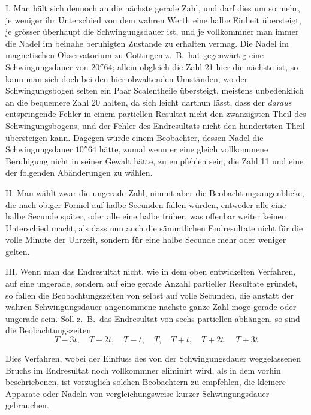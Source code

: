 I. Man hält sich dennoch an die nächste gerade Zahl, und darf dies um so mehr, je weniger ihr Unterschied von dem wahren Werth eine halbe Einheit übersteigt, je grösser überhaupt die Schwingungsdauer ist, und je vollkommner man immer die Nadel im beinahe beruhigten Zustande zu erhalten vermag. Die Nadel im magnetischen Observatorium zu Göttingen z.\ B.\ hat gegenwärtig eine Schwingungsdauer von $20''64$; allein obgleich die Zahl 21 hier die nächste ist, so kann man sich doch bei den hier obwaltenden Umständen, wo der Schwingungsbogen selten ein Paar Scalentheile übersteigt, meistens unbedenklich an die bequemere Zahl 20 halten, da sich leicht darthun lässt, dass der \textit{daraus} entspringende Fehler in einem partiellen Resultat nicht den zwanzigsten Theil des Schwingungsbogens, und der Fehler des Endresultats nicht den hundertsten Theil übersteigen kann. Dagegen würde einem Beobachter, dessen Nadel die Schwingungsdauer $10''64$ hätte, zumal wenn er eine gleich vollkommene Beruhigung nicht in seiner Gewalt hätte, zu empfehlen sein, die Zahl 11 und eine der folgenden Abänderungen zu wählen.

II. Man wählt zwar die ungerade Zahl, nimmt aber die Beobachtungsaugenblicke, die nach obiger Formel auf halbe Secunden fallen würden, entweder alle eine halbe Secunde später, oder alle eine halbe früher, was offenbar weiter keinen Unterschied macht, als dass nun auch die sämmtlichen Endresultate nicht für die volle Minute der Uhrzeit, sondern für eine halbe Secunde mehr oder weniger gelten.

\par\clearpage
{}
III. Wenn man das Endresultat nicht, wie in dem oben entwickelten Verfahren, auf eine ungerade, sondern auf eine gerade Anzahl partieller Resultate gründet, so fallen die Beobachtungszeiten von selbst auf volle Secunden, die anstatt der wahren Schwingungsdauer angenommene nächste ganze Zahl möge gerade oder ungerade sein. Soll z.\ B.\ das Endresultat von sechs partiellen abhängen, so sind die Beobachtungszeiten
\[
T-3t,\quad T-2t,\quad T-t,\quad T,\quad T+t,\quad T+2t,\quad T+3t
\]

Dies Verfahren, wobei der Einfluss des von der Schwingungsdauer weggelassenen Bruchs im Endresultat noch vollkommner eliminirt wird, als in dem vorhin beschriebenen, ist vorzüglich solchen Beobachtern zu empfehlen, die kleinere Apparate oder Nadeln von vergleichungsweise kurzer Schwingungsdauer gebrauchen.

